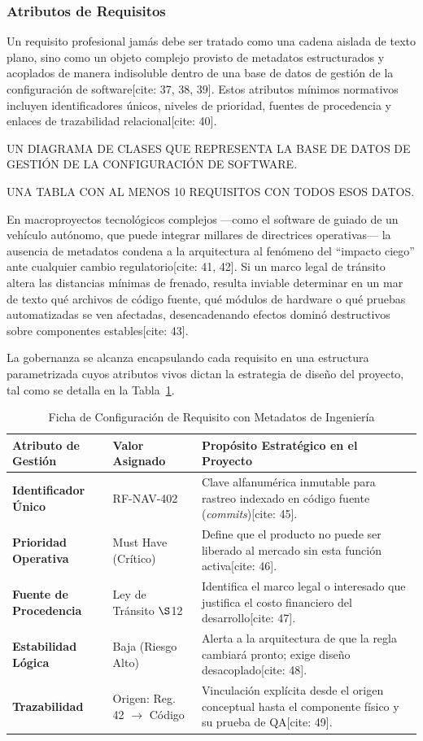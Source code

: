 \documentclass[11pt,a4paper]{article}
\begin{document}
	\subsubsection{Atributos de Requisitos}
	Un requisito profesional jamás debe ser tratado como una cadena aislada de texto plano, sino como un objeto complejo provisto de metadatos estructurados y acoplados de manera indisoluble dentro de una base de datos de gestión de la configuración de software[cite: 37, 38, 39]. Estos atributos mínimos normativos incluyen identificadores únicos, niveles de prioridad, fuentes de procedencia y enlaces de trazabilidad relacional[cite: 40].
	
	UN DIAGRAMA DE CLASES QUE REPRESENTA LA BASE DE DATOS DE GESTIÓN DE LA CONFIGURACIÓN DE SOFTWARE.
	
	UNA TABLA CON AL MENOS 10 REQUISITOS CON TODOS ESOS DATOS.
	
	En macroproyectos tecnológicos complejos —como el software de guiado de un vehículo autónomo, que puede integrar millares de directrices operativas— la ausencia de metadatos condena a la arquitectura al fenómeno del ``impacto ciego'' ante cualquier cambio regulatorio[cite: 41, 42]. Si un marco legal de tránsito altera las distancias mínimas de frenado, resulta inviable determinar en un mar de texto qué archivos de código fuente, qué módulos de hardware o qué pruebas automatizadas se ven afectadas, desencadenando efectos dominó destructivos sobre componentes estables[cite: 43].
	
	La gobernanza se alcanza encapsulando cada requisito en una estructura parametrizada cuyos atributos vivos dictan la estrategia de diseño del proyecto, tal como se detalla en la Tabla~\ref{tab:atributos}.
	
	\begin{table}[htbp]
		\centering
		\caption{Ficha de Configuración de Requisito con Metadatos de Ingeniería}
		\label{tab:atributos}
		\begin{tabular}{llp{7.5cm}}
			\toprule
			\textbf{Atributo de Gestión} & \textbf{Valor Asignado} & \textbf{Propósito Estratégico en el Proyecto} \\ \midrule
			\textbf{Identificador Único} & RF-NAV-402 & Clave alfanumérica inmutable para rastreo indexado en código fuente (\textit{commits})[cite: 45]. \\
			\textbf{Prioridad Operativa} & Must Have (Crítico) & Define que el producto no puede ser liberado al mercado sin esta función activa[cite: 46]. \\
			\textbf{Fuente de Procedencia} & Ley de Tránsito $\S$12 & Identifica el marco legal o interesado que justifica el costo financiero del desarrollo[cite: 47]. \\
			\textbf{Estabilidad Lógica} & Baja (Riesgo Alto) & Alerta a la arquitectura de que la regla cambiará pronto; exige diseño desacoplado[cite: 48]. \\
			\textbf{Trazabilidad} & Origen: Reg. 42 $\rightarrow$ Código & Vinculación explícita desde el origen conceptual hasta el componente físico y su prueba de QA[cite: 49]. \\ \bottomrule
		\end{tabular}
	\end{table}
	
\end{document}
